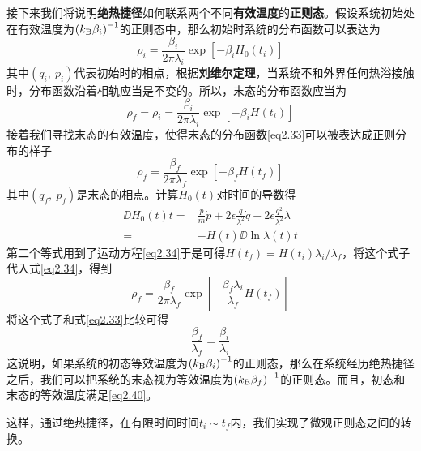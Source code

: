 接下来我们将说明\textbf{绝热捷径}如何联系两个不同\textbf{有效温度}的\textbf{正则态}。\cite{Tu2013}假设系统初始处在有效温度为$\left(k_{\mathrm{B}} \beta_i\right)^{-1}$的正则态中，那么初始时系统的分布函数可以表达为
\begin{equation}
    \rho_{i}=\frac{\beta_{i}}{2 \pi \lambda_{i}} \exp \left[-\beta_{i} H_0 \left(t_{i}\right)\right]
    \label{eq2.32}
\end{equation}
其中$(q_i,\ p_i)$代表初始时的相点，根据\textbf{刘维尔定理}，当系统不和外界任何热浴接触时，分布函数沿着相轨应当是不变的。所以，末态的分布函数应当为
\begin{equation}
    \rho_{f}=\rho_{i}=\frac{\beta_{i} }{2 \pi \lambda_{i}} \exp \left[-\beta_{i} H\left(t_{i}\right)\right]
    \label{eq2.33}
\end{equation}
接着我们寻找末态的有效温度，使得末态的分布函数\eqref{eq2.33}可以被表达成正则分布的样子
\begin{equation}
    \rho_{f}=\frac{\beta_{f} }{2 \pi \lambda_{f}} \exp \left[-\beta_{f} H\left(t_{f}\right)\right]
    \label{eq2.34}
\end{equation}
其中$(q_f,\ p_f)$是末态的相点。计算$H_0 (t)$对时间的导数得
\begin{equation}
    \begin{split}
        \DD{H_0 (t)}{t} =& \frac{p}{m}\dot{p} + 2 \epsilon \frac{q}{\lambda^2}\dot{q} - 2 \epsilon \frac{q^2}{\lambda^2} \dot{\lambda}\\
                        =& -H(t) \DD{\ln{\lambda(t)}}{t}
    \end{split}
    \label{eq2.35}
\end{equation}
第二个等式用到了运动方程\eqref{eq2.34}于是可得$H\left(t_{f}\right)=H\left(t_{i}\right) \lambda_{i} / \lambda_{f}$，将这个式子代入式\eqref{eq2.34}，得到
\begin{equation}
    \rho_{f}=\frac{\beta_{f} }{2 \pi \lambda_{f}} \exp \left[-\frac{\beta_{f} \lambda_i}{\lambda_f} H\left(t_{f}\right)\right]
    \label{eq2.36}
\end{equation}
将这个式子和式\eqref{eq2.33}比较可得
\begin{equation}
    \frac{\beta_f}{\lambda_f} = \frac{\beta_i}{\lambda_i}
    \label{eq2.40}
\end{equation}
这说明，如果系统的初态等效温度为$\left( k_{\mathrm{B}} \beta_i\right)^{-1}$的正则态，那么在系统经历绝热捷径之后，我们可以把系统的末态视为等效温度为$\left( k_{\mathrm{B}} \beta_f\right)^{-1}$的正则态。而且，初态和末态的等效温度满足\eqref{eq2.40}。

这样，通过绝热捷径，在有限时间时间$t_i \sim t_f$内，我们实现了微观正则态之间的转换。


